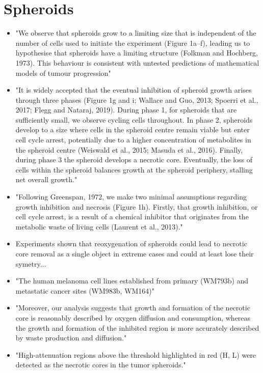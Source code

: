 \documentclass[11pt,a4paper]{article}
\begin{document}
\section{Spheroids}
\begin{itemize}
\item "We observe that spheroids grow to a limiting size that is independent of the number of cells used to initiate the experiment (Figure 1a–f), leading us to hypothesise that spheroids have a limiting structure (Folkman and Hochberg, 1973). This behaviour is consistent with untested predictions of mathematical models of tumour progression"\cite{Browning2021}
\item "It is widely accepted that the eventual inhibition of spheroid growth arises through three phases (Figure 1g and i; Wallace and Guo, 2013; Spoerri et al., 2017; Flegg and Nataraj, 2019). During phase 1, for spheroids that are sufficiently small, we observe cycling cells throughout. In phase 2, spheroids develop to a size where cells in the spheroid centre remain viable but enter cell cycle arrest, potentially due to a higher concentration of metabolites in the spheroid centre (Weiswald et al., 2015; Masuda et al., 2016). Finally, during phase 3 the spheroid develops a necrotic core. Eventually, the loss of cells within the spheroid balances growth at the spheroid periphery, stalling net overall growth."\cite{Browning2021}
\item "Following Greenspan, 1972, we make two minimal assumptions regarding growth inhibition and necrosis (Figure 1h). Firstly, that growth inhibition, or cell cycle arrest, is a result of a chemical inhibitor that originates from the metabolic waste of living cells (Laurent et al., 2013)."\cite{Browning2021}
\item Experiments shown that reoxygenation of spheroids could lead to necrotic core removal as a single object in extreme cases and could at least lose their symetry...\cite{Murphy2023}
\item "The human melanoma cell lines established from primary (WM793b) and metastatic cancer sites (WM983b, WM164)"\cite{Murphy2023}
\item "Moreover, our analysis suggests that growth and formation of the necrotic core is reasonably described by oxygen diffusion and consumption, whereas the growth and formation of the inhibited region is more accurately described by waste production and diffusion."\cite{Murphy2023}
\item "High-attenuation regions above the threshold highlighted in red (H, L) were detected as the necrotic cores in the tumor spheroids."\cite{Huang2017}

\end{itemize}
\end{document}
